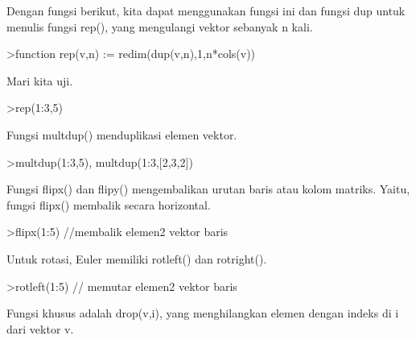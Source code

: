 \begin{eulernotebook}
\begin{eulercomment}
\begin{eulercomment}
\begin{eulercomment}
Dengan fungsi berikut, kita dapat menggunakan fungsi ini dan fungsi
dup untuk menulis fungsi rep(), yang mengulangi vektor sebanyak n
kali.
\end{eulercomment}
\begin{eulerprompt}
>function rep(v,n) := redim(dup(v,n),1,n*cols(v))
\end{eulerprompt}
\begin{eulercomment}
Mari kita uji.
\end{eulercomment}
\begin{eulerprompt}
>rep(1:3,5)
\end{eulerprompt}
\begin{euleroutput}
  [1,  2,  3,  1,  2,  3,  1,  2,  3,  1,  2,  3,  1,  2,  3]
\end{euleroutput}
\begin{eulercomment}
Fungsi multdup() menduplikasi elemen vektor.
\end{eulercomment}
\begin{eulerprompt}
>multdup(1:3,5), multdup(1:3,[2,3,2])
\end{eulerprompt}
\begin{euleroutput}
  [1,  1,  1,  1,  1,  2,  2,  2,  2,  2,  3,  3,  3,  3,  3]
  [1,  1,  2,  2,  2,  3,  3]
\end{euleroutput}
\begin{eulercomment}
Fungsi flipx() dan flipy() mengembalikan urutan baris atau kolom
matriks. Yaitu, fungsi flipx() membalik secara horizontal.
\end{eulercomment}
\begin{eulerprompt}
>flipx(1:5) //membalik elemen2 vektor baris
\end{eulerprompt}
\begin{euleroutput}
  [5,  4,  3,  2,  1]
\end{euleroutput}
\begin{eulercomment}
Untuk rotasi, Euler memiliki rotleft() dan rotright().
\end{eulercomment}
\begin{eulerprompt}
>rotleft(1:5) // memutar elemen2 vektor baris
\end{eulerprompt}
\begin{euleroutput}
  [2,  3,  4,  5,  1]
\end{euleroutput}
\begin{eulercomment}
Fungsi khusus adalah drop(v,i), yang menghilangkan elemen dengan
indeks di i dari vektor v.
\end{eulercomment}
\begin{eulerprompt}

\end{eulerprompt}
\end{eulercomment}
\end{eulercomment}
\end{eulernotebook}
